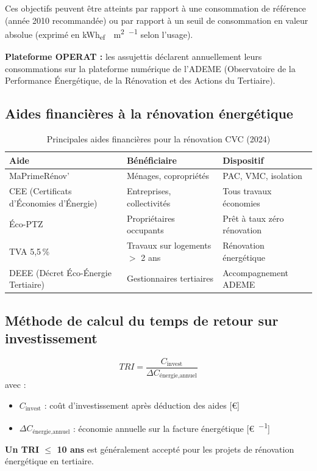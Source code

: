 Ces objectifs peuvent être atteints par rapport à une consommation de référence (année 2010 recommandée) ou par rapport à un seuil de consommation en valeur absolue (exprimé en \si{\kWh_{ef} \per \metre\squared \per \year} selon l'usage).

\textbf{Plateforme OPERAT :} les assujettis déclarent annuellement leurs consommations sur la plateforme numérique de l'ADEME (Observatoire de la Performance Énergétique, de la Rénovation et des Actions du Tertiaire).

\subsection{Aides financières à la rénovation énergétique}

\begin{table}[H]
  \centering
  \caption{Principales aides financières pour la rénovation CVC (2024)}
  \begin{tabular}{p{3.5cm}p{4cm}p{4cm}}
    \toprule
    Aide & Bénéficiaire & Dispositif \\
    \midrule
    MaPrimeRénov' & Ménages, copropriétés & PAC, VMC, isolation \\
    CEE (Certificats d'Économies d'Énergie) & Entreprises, collectivités & Tous travaux économies \\
    Éco-PTZ & Propriétaires occupants & Prêt à taux zéro rénovation \\
    TVA 5,5\,\% & Travaux sur logements $>$ 2 ans & Rénovation énergétique \\
    DEEE (Décret Éco-Énergie Tertiaire) & Gestionnaires tertiaires & Accompagnement ADEME \\
    \bottomrule
  \end{tabular}
\end{table}

\subsection{Méthode de calcul du temps de retour sur investissement}

\begin{methode}[title=Temps de retour sur investissement (TRI simplifié)]
\begin{equation}
  TRI = \frac{C_{\text{invest}}}{\Delta C_{\text{énergie,annuel}}}
\end{equation}
avec :
\begin{itemize}
  \item $C_{\text{invest}}$ : coût d'investissement après déduction des aides [\si{\euro}]
  \item $\Delta C_{\text{énergie,annuel}}$ : économie annuelle sur la facture énergétique [\si{\euro \per \year}]
\end{itemize}
\textbf{Un TRI $\leq$ 10 ans} est généralement accepté pour les projets de rénovation énergétique en tertiaire.
\end{methode}

